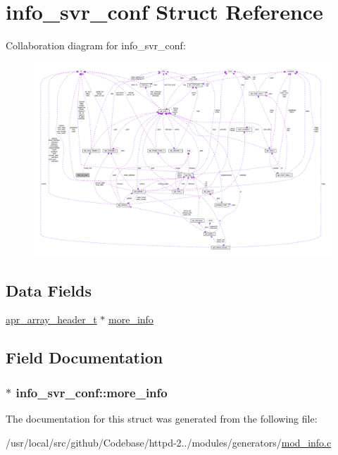 \hypertarget{structinfo__svr__conf}{}\section{info\+\_\+svr\+\_\+conf Struct Reference}
\label{structinfo__svr__conf}


Collaboration diagram for info\+\_\+svr\+\_\+conf\+:
\nopagebreak
\begin{figure}[H]
\begin{center}
\leavevmode
\includegraphics[width=350pt]{structinfo__svr__conf__coll__graph}
\end{center}
\end{figure}
\subsection*{Data Fields}
\begin{DoxyCompactItemize}
\item 
\hyperlink{structapr__array__header__t}{apr\+\_\+array\+\_\+header\+\_\+t} $\ast$ \hyperlink{structinfo__svr__conf_a69e82cf4d76a1349330f0d155faf9259}{more\+\_\+info}
\end{DoxyCompactItemize}


\subsection{Field Documentation}
\subsubsection[{\texorpdfstring{more\+\_\+info}{more_info}}]{$\ast$ info\+\_\+svr\+\_\+conf\+::more\+\_\+info}\hypertarget{structinfo__svr__conf_a69e82cf4d76a1349330f0d155faf9259}{}\label{structinfo__svr__conf_a69e82cf4d76a1349330f0d155faf9259}


The documentation for this struct was generated from the following file\+:\begin{DoxyCompactItemize}
\item 
/usr/local/src/github/\+Codebase/httpd-\/2../modules/generators/\hyperlink{mod__info_8c}{mod\+\_\+info.\+c}\end{DoxyCompactItemize}
